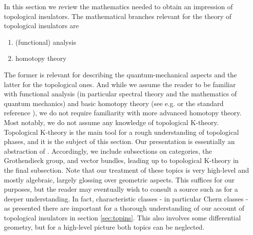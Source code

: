 \nocite{8b5861fc}
\nocite{c7f15065}
In this section we review the mathematics needed to obtain an impression of topological insulators.
The mathematical branches relevant for the theory of topological insulators are
\begin{enumerate}
\item[$\bullet$]
  (functional) analysis
\item[$\bullet$]
  homotopy theory
\end{enumerate}
The former is relevant for describing the quantum-mechanical aspects and the latter for the topological ones.
And while we assume the reader to be familiar with functional analysis (in particular spectral theory and the mathematics of quantum mechanics) and basic homotopy theory (see e.g. \cite{catctxphy} or the standard reference \cite{8b5861fc}), we do not require familiarity with more advanced homotopy theory.
Most notably, we do not assume any knowledge of topological K-theory.
Topological K-theory is the main tool for a rough understanding of topological phases, and it is the subject of this section.
Our presentation is essentially an abstraction of \cite{c7f15065}.
Accordingly, we include subsections on categories, the Grothendieck group, and vector bundles, leading up to topological K-theory in the final subsection.
Note that our treatment of these topics is very high-level and mostly algebraic, largely glossing over geometric aspects.
This suffices for our purposes, but the reader may eventually wish to consult a source such as \cite{c7f15065} for a deeper understanding.
In fact, characteristic classes - in particular Chern classes - as presented there are important for a thorough understanding of our account of topological insulators in section \ref{sec:topins}.
This also involves some differential geometry, but for a high-level picture both topics can be neglected.
\\
